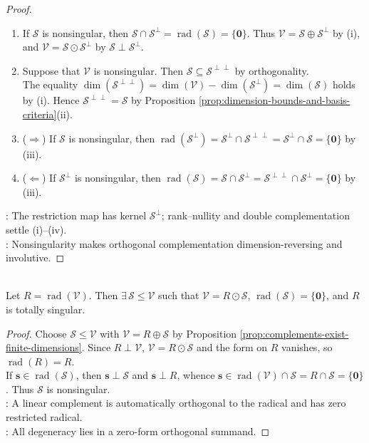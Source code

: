 \begin{theorem}
\begin{proof}
\begin{enumerate}[label=(\roman*)]
\item[$(ii)$] If $\mathcal{S}$ is nonsingular, then $\mathcal{S}\cap\mathcal{S}^{\perp}=\operatorname{rad}(\mathcal{S})=\{\mathbf{0}\}$. Thus $\mathcal{V}=\mathcal{S}\oplus\mathcal{S}^{\perp}$ by (i), and $\mathcal{V}=\mathcal{S}\odot\mathcal{S}^{\perp}$ by $\mathcal{S}\perp\mathcal{S}^{\perp}$.
\item[$(iii)$] Suppose that $\mathcal{V}$ is nonsingular. Then $\mathcal{S}\subseteq\mathcal{S}^{\perp\perp}$ by orthogonality.\\
The equality $\dim(\mathcal{S}^{\perp\perp})=\dim(\mathcal{V})-\dim(\mathcal{S}^{\perp})=\dim(\mathcal{S})$ holds by (i). Hence $\mathcal{S}^{\perp\perp}=\mathcal{S}$ by Proposition \ref{prop:dimension-bounds-and-basis-criteria}(ii).
\item[$(iv)$] ($\Rightarrow$) If $\mathcal{S}$ is nonsingular, then $\operatorname{rad}(\mathcal{S}^{\perp})=\mathcal{S}^{\perp}\cap\mathcal{S}^{\perp\perp}=\mathcal{S}^{\perp}\cap\mathcal{S}=\{\mathbf{0}\}$ by (iii).
\item[$(iv)$] ($\Leftarrow$) If $\mathcal{S}^{\perp}$ is nonsingular, then $\operatorname{rad}(\mathcal{S})=\mathcal{S}\cap\mathcal{S}^{\perp}=\mathcal{S}^{\perp\perp}\cap\mathcal{S}^{\perp}=\{\mathbf{0}\}$ by (iii).
\end{enumerate}
: The restriction map has kernel $\mathcal{S}^{\perp}$; rank--nullity and double complementation settle (i)--(iv).\\
: Nonsingularity makes orthogonal complementation dimension-reversing and involutive.
\end{proof}
\end{theorem}

\begin{theorem} \label{thm:radical-splitting-metric-space} \\
Let $R=\operatorname{rad}(\mathcal{V})$. Then $\exists\,\mathcal{S}\leq\mathcal{V}$ such that $\mathcal{V}=R\odot\mathcal{S}$, $\operatorname{rad}(\mathcal{S})=\{\mathbf{0}\}$, and $R$ is totally singular.
\begin{proof}
Choose $\mathcal{S}\leq\mathcal{V}$ with $\mathcal{V}=R\oplus\mathcal{S}$ by Proposition \ref{prop:complements-exist-finite-dimensions}. Since $R\perp\mathcal{V}$, $\mathcal{V}=R\odot\mathcal{S}$ and the form on $R$ vanishes, so $\operatorname{rad}(R)=R$.\\
If $\mathbf{s}\in\operatorname{rad}(\mathcal{S})$, then $\mathbf{s}\perp\mathcal{S}$ and $\mathbf{s}\perp R$, whence $\mathbf{s}\in\operatorname{rad}(\mathcal{V})\cap\mathcal{S}=R\cap\mathcal{S}=\{\mathbf{0}\}$. Thus $\mathcal{S}$ is nonsingular.\\
: A linear complement is automatically orthogonal to the radical and has zero restricted radical.\\
: All degeneracy lies in a zero-form orthogonal summand.
\end{proof}
\end{theorem}

